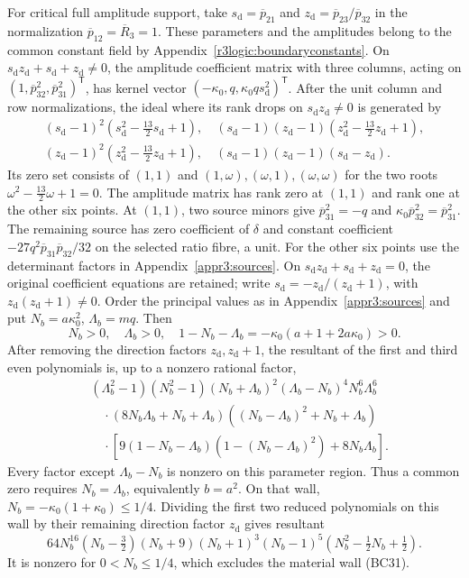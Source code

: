 \documentclass[11pt,a4paper]{article}
\numberwithin{equation}{section}
\theoremstyle{plain}
\theoremstyle{definition}
\theoremstyle{remark}
\begin{document}
For critical full amplitude support, take
$s_{\mathrm d}=\overline p_{21}$ and $z_{\mathrm d}=\overline p_{23}/\overline p_{32}$
in the normalization $\overline p_{12}=\overline R_3=1$.
These parameters and the amplitudes belong to the common constant
field by Appendix~\ref{r3logic:boundaryconstants}.
On $s_{\mathrm d}z_{\mathrm d}+s_{\mathrm d}+z_{\mathrm d}\ne0$, the amplitude coefficient matrix with three columns,
acting on $(1,\overline p_{32}^2,\overline p_{31}^2)^{\mathsf T}$,
has kernel vector $(-\kappa_0,q,\kappa_0q s_{\mathrm d}^2)^{\mathsf T}$.
After the unit column and row normalizations, the ideal where its rank drops
on $s_{\mathrm d}z_{\mathrm d}\ne0$ is generated by
\[
 \begin{gathered}
 (s_{\mathrm d}-1)^2(s_{\mathrm d}^2-\tfrac{13}{2}s_{\mathrm d}+1),\quad
 (s_{\mathrm d}-1)(z_{\mathrm d}-1)(z_{\mathrm d}^2-\tfrac{13}{2}z_{\mathrm d}+1),\\
 (z_{\mathrm d}-1)^2(z_{\mathrm d}^2-\tfrac{13}{2}z_{\mathrm d}+1),\quad
 (s_{\mathrm d}-1)(z_{\mathrm d}-1)(s_{\mathrm d}-z_{\mathrm d}).
 \end{gathered}
\]
Its zero set consists of $(1,1)$ and
$(1,\omega),(\omega,1),(\omega,\omega)$ for the two roots
$\omega^2-\tfrac{13}{2}\omega+1=0$.
The amplitude matrix has rank zero at $(1,1)$ and rank one
at the other six points. At $(1,1)$, two source minors give
$\overline p_{31}^2=-q$ and
$\kappa_0\overline p_{32}^2=\overline p_{31}^2$.
The remaining source has zero coefficient of $\delta$ and constant
coefficient $-27q^2\overline p_{31}\overline p_{32}/32$ on the selected
ratio fibre, a unit. For the other six points use the determinant
factors in Appendix~\ref{appr3:sources}.
On $s_{\mathrm d}z_{\mathrm d}+s_{\mathrm d}+z_{\mathrm d}=0$, the original coefficient equations are retained;
write $s_{\mathrm d}=-z_{\mathrm d}/(z_{\mathrm d}+1)$, with $z_{\mathrm d}(z_{\mathrm d}+1)\ne0$.
Order the principal values as in Appendix~\ref{appr3:sources} and put
$N_b=a\kappa_0^2$, $\Lambda_b=mq$. Then
\[
 N_b>0,\quad\Lambda_b>0,\quad
 1-N_b-\Lambda_b=-\kappa_0(a+1+2a\kappa_0)>0.
\]
After removing the direction factors $z_{\mathrm d},z_{\mathrm d}+1$, the resultant of the
first and third even polynomials is, up to a nonzero rational factor,
\[
 \begin{aligned}
 &(\Lambda_b^2-1)(N_b^2-1)(N_b+\Lambda_b)^2
       (\Lambda_b-N_b)^4N_b^6\Lambda_b^6\\
 &\quad\cdot(8N_b\Lambda_b+N_b+\Lambda_b)
       ((N_b-\Lambda_b)^2+N_b+\Lambda_b)\\
 &\quad\cdot\left[9(1-N_b-\Lambda_b)
       (1-(N_b-\Lambda_b)^2)+8N_b\Lambda_b\right].
 \end{aligned}
\]
Every factor except $\Lambda_b-N_b$ is nonzero on this parameter
region. Thus a common zero requires $N_b=\Lambda_b$, equivalently
$b=a^2$. On that wall,
$N_b=-\kappa_0(1+\kappa_0)\le1/4$.
Dividing the first two reduced polynomials on this wall by their
remaining direction factor $z_{\mathrm d}$ gives resultant
\[
 64N_b^{16}(N_b-\tfrac32)(N_b+9)(N_b+1)^3(N_b-1)^5
       (N_b^2-\tfrac12N_b+\tfrac12).
\]
It is nonzero for $0<N_b\le1/4$, which excludes the material wall
(BC31).
\end{document}
